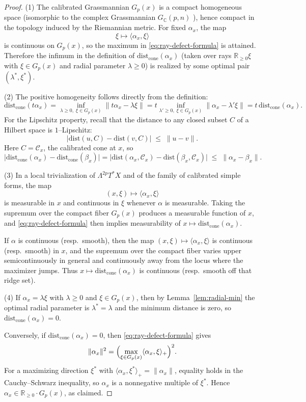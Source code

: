 \documentclass[11pt]{article}
\newcommand{\REVMZ}[1]{\textcolor{teal}{#1}}  %
\numberwithin{equation}{section}  %
\theoremstyle{plain}
\theoremstyle{definition}
\theoremstyle{remark}
\newcommand{\R}{\mathbb{R}}
\newcommand{\C}{\mathbb{C}}
\newcommand{\dist}{\mathrm{dist}}
\newcommand{\cone}{\mathrm{cone}}
\newcommand{\distcone}{\dist_{\cone}}        %
\newcommand{\Gp}{G_p}
\begin{document}
\begin{proof}
	(1) The calibrated Grassmannian $\Gp(x)$ is a compact homogeneous space
	(isomorphic to the complex Grassmannian $G_{\C}(p,n)$ \REVMZ{\cite{GH78}}), hence compact in the
	topology induced by the Riemannian metric.
	For fixed $\alpha_{x}$, the map
	\[
	\xi \longmapsto \langle \alpha_{x}, \xi \rangle
	\]
	is continuous on $\Gp(x)$, so the maximum in
	\eqref{eq:ray-defect-formula} is attained.  Therefore the infimum in the
	definition of $\distcone(\alpha_{x})$ (taken over rays
	$\R_{\ge 0}\xi$ with $\xi \in \Gp(x)$ and radial parameter
	$\lambda\ge 0$) is realized by some optimal pair
	$(\lambda^{*},\xi^{*})$.
	
	(2) The positive homogeneity follows directly from the definition:
	\[
	\distcone(t\alpha_{x})
	=
	\inf_{\lambda \ge 0,\;\xi \in \Gp(x)}
	\|t\alpha_{x} - \lambda \xi\|
	=
	t\inf_{\lambda' \ge 0,\;\xi \in \Gp(x)}
	\|\alpha_{x} - \lambda' \xi\|
	=
	t\,\distcone(\alpha_{x}).
	\]
	For the Lipschitz property, recall that the distance to any closed subset
	$C$ of a Hilbert space is $1$--Lipschitz:
	\[
	\bigl|\dist(u,C) - \dist(v,C)\bigr|
	\;\le\;
	\|u-v\|.
	\]
	Here $C = \mathcal{C}_{x}$, the calibrated cone at $x$, so
	\[
	\bigl|
	\distcone(\alpha_{x})
	-
	\distcone(\beta_{x})
	\bigr|
	=
	\bigl|
	\dist(\alpha_{x},\mathcal{C}_{x})
	-
	\dist(\beta_{x},\mathcal{C}_{x})
	\bigr|
	\;\le\;
	\|\alpha_{x} - \beta_{x}\|.
	\]
	
	(3) In a local trivialization of $\Lambda^{2p}T^{*}X$ and of the family of
	calibrated simple forms, the map
	\[
	(x,\xi) \longmapsto \langle \alpha_{x}, \xi \rangle
	\]
	is measurable in $x$ and continuous in $\xi$ whenever $\alpha$ is
	measurable.  Taking the supremum over the compact fiber
	$\Gp(x)$ produces a measurable function of $x$, and
	\eqref{eq:ray-defect-formula} then implies measurability of
	$x \mapsto \distcone(\alpha_{x})$.
	
	If $\alpha$ is continuous (resp.\ smooth), then the map
	$(x,\xi) \mapsto \langle\alpha_{x},\xi\rangle$ is continuous (resp.\ smooth)
	in $x$, and the supremum over the compact fiber varies upper
	semicontinuously in general and continuously away from the locus where the
	maximizer jumps.  Thus $x \mapsto \distcone(\alpha_{x})$ is
	continuous (resp.\ smooth off that ridge set).
	
	(4) If $\alpha_{x} = \lambda\xi$ with $\lambda \ge 0$ and
	$\xi \in \Gp(x)$, then by Lemma~\ref{lem:radial-min} the optimal
	radial parameter is $\lambda^{*}=\lambda$ and the minimum distance is zero,
	so $\distcone(\alpha_{x})=0$.
	
	Conversely, if $\distcone(\alpha_{x})=0$, then
	\eqref{eq:ray-defect-formula} gives
	\[
	\|\alpha_{x}\|^{2}
	=
	\Bigl(
	\max_{\xi \in \Gp(x)}
	\langle \alpha_{x}, \xi \rangle_{+}
	\Bigr)^{2}.
	\]
	For a maximizing direction $\xi^{*}$ with 
	$\langle\alpha_{x},\xi^{*}\rangle_{+} = \|\alpha_{x}\|$, equality holds in
	the Cauchy--Schwarz inequality, so $\alpha_{x}$ is a nonnegative multiple of
	$\xi^{*}$.  Hence $\alpha_{x} \in \R_{\ge 0}\cdot\Gp(x)$,
	as claimed.
\end{proof}
\end{document}
